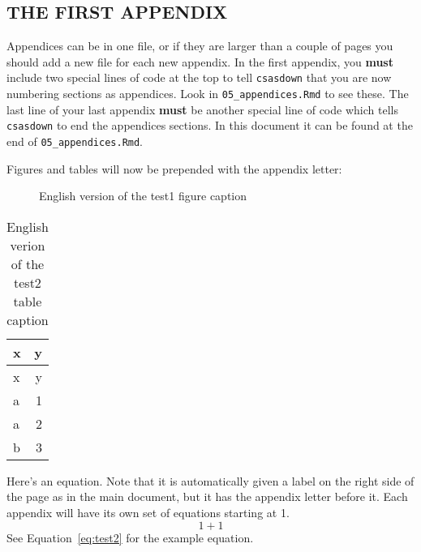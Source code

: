 \documentclass[12pt]{article}\usepackage[]{graphicx}\usepackage[]{color}
\begin{document}
\begin{appendices}

\clearpage

\section{THE FIRST APPENDIX}
\label{app:first-appendix}

Appendices can be in one file, or if they are larger than a couple of pages you should add a new file for each new appendix. In the first appendix, you \textbf{must} include two special lines of code at the top to tell \texttt{csasdown} that you are now numbering sections as appendices. Look in \texttt{05\_appendices.Rmd} to see these. The last line of your last appendix \textbf{must} be another special line of code which tells \texttt{csasdown} to end the appendices sections. In this document it can be found at the end of \texttt{05\_appendices.Rmd}.

Figures and tables will now be prepended with the appendix letter:




\begin{figure}[htb]

{\centering {} 

}

\caption{English version of the test1 figure caption}\label{fig:test1}
\end{figure}
\begin{longtable}[]{@{}lr@{}}
\caption{\label{tab:test2}English verion of the test2 table caption}\tabularnewline
\toprule()
x & y \\
\midrule()
\endfirsthead
\toprule()
x & y \\
\midrule()
\endhead
a & 1 \\
a & 2 \\
b & 3 \\
\bottomrule()
\end{longtable}
Here's an equation. Note that it is automatically given a label on the right side of the page as in the main document, but it has the appendix letter before it. Each appendix will have its own set of equations starting at 1.
\begin{equation}
  1 + 1
  \label{eq:test2}
\end{equation}
See Equation~\ref{eq:test2} for the example equation.


\end{appendices}
\end{document}

